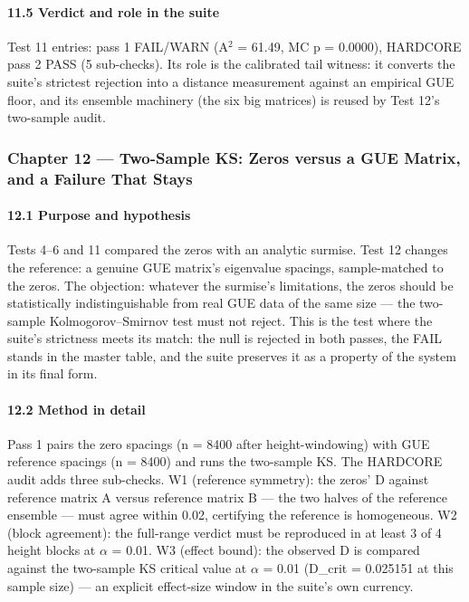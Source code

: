 \documentclass[10pt]{article}
\begin{document}
\paragraph{11.5 Verdict and role in the suite}

Test 11 entries: pass 1 FAIL/WARN (A$^2$ = 61.49, MC p = 0.0000), HARDCORE pass 2 PASS (5 sub-checks). Its role is the calibrated tail witness: it converts the suite's strictest rejection into a distance measurement against an empirical GUE floor, and its ensemble machinery (the six big matrices) is reused by Test 12's two-sample audit.

\subsubsection{Chapter 12 --- Two-Sample KS: Zeros versus a GUE Matrix, and a Failure That Stays}

\paragraph{12.1 Purpose and hypothesis}

Tests 4--6 and 11 compared the zeros with an analytic surmise. Test 12 changes the reference: a genuine GUE matrix's eigenvalue spacings, sample-matched to the zeros. The objection: whatever the surmise's limitations, the zeros should be statistically indistinguishable from real GUE data of the same size --- the two-sample Kolmogorov--Smirnov test must not reject. This is the test where the suite's strictness meets its match: the null is rejected in both passes, the FAIL stands in the master table, and the suite preserves it as a property of the system in its final form.

\paragraph{12.2 Method in detail}

Pass 1 pairs the zero spacings (n = 8400 after height-windowing) with GUE reference spacings (n = 8400) and runs the two-sample KS. The HARDCORE audit adds three sub-checks. W1 (reference symmetry): the zeros' D against reference matrix A versus reference matrix B --- the two halves of the reference ensemble --- must agree within 0.02, certifying the reference is homogeneous. W2 (block agreement): the full-range verdict must be reproduced in at least 3 of 4 height blocks at $\alpha$ = 0.01. W3 (effect bound): the observed D is compared against the two-sample KS critical value at $\alpha$ = 0.01 (D\_crit = 0.025151 at this sample size) --- an explicit effect-size window in the suite's own currency.
\end{document}
